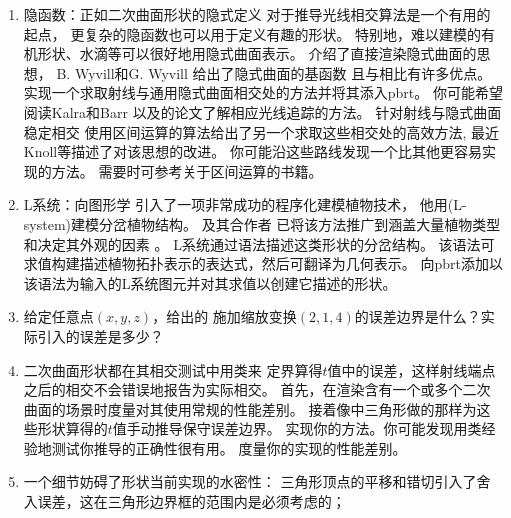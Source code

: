\begin{enumerate}
    \item \circlethree 隐函数：正如二次曲面形状的隐式定义
          对于推导光线相交算法是一个有用的起点，
          更复杂的隐函数也可以用于定义有趣的形状。
          特别地，难以建模的有机形状、水滴等可以很好地用隐式曲面表示。
          \citet{10.1145/357306.357310}介绍了直接渲染隐式曲面的思想，
          B. Wyvill和G. Wyvill \parencite*{Wyvill1989}给出了隐式曲面的基函数
          且与\citeauthor{10.1145/357306.357310}相比有许多优点。
          实现一个求取射线与通用隐式曲面相交处的方法并将其添入pbrt。
          你可能希望阅读Kalra和Barr \parencite*{10.1145/74333.74364}
          以及\citet{Hart1996}的论文了解相应光线追踪的方法。
          \citet{10.5555/93267.93276}针对射线与隐式曲面稳定相交
          使用区间运算的算法给出了另一个求取这些相交处的高效方法,
          最近Knoll等\parencite*{10.1111/j.1467-8659.2008.01189.x}描述了对该思想的改进。
          你可能沿这些路线发现一个比其他更容易实现的方法。
          需要时可参考\citet{moore1966interval}关于区间运算的书籍。
    \item \circlethree L系统：\citet{10.1145/800031.808571}向图形学
          引入了一项非常成功的程序化建模植物技术，
          他用(L-system)建模分岔植物结构。
          \citeauthor{Prusinkiewicz:1986:10.20380/GI1986.44}及其合作者
          已将该方法推广到涵盖大量植物类型和决定其外观的因素
          \citep{Prusinkiewicz:1986:10.20380/GI1986.44,10.1145/192161.192254,
              10.1145/280814.280898,10.1145/383259.383291}。
          L系统通过语法描述这类形状的分岔结构。
          该语法可求值构建描述植物拓扑表示的表达式，然后可翻译为几何表示。
          向pbrt添加以该语法为输入的L系统图元并对其求值以创建它描述的形状。
    \item \circleone 给定任意点$(x,y,z)$，给出的
          施加缩放变换$(2,1,4)$的误差边界是什么？实际引入的误差是多少？
    \item \circletwo 二次曲面形状都在其相交测试中用类来
          定界算得$t$值中的误差，这样射线端点之后的相交不会错误地报告为实际相交。
          首先，在渲染含有一个或多个二次曲面的场景时度量对其使用常规的性能差别。
          接着像中三角形做的那样为这些形状算得的$t$值手动推导保守误差边界。
          实现你的方法。你可能发现用类经验地测试你推导的正确性很有用。
          度量你的实现的性能差别。
    \item \circletwo 一个细节妨碍了形状当前实现的水密性：
          三角形顶点的平移和错切引入了舍入误差，这在三角形边界框的范围内是必须考虑的；

\end{enumerate}
